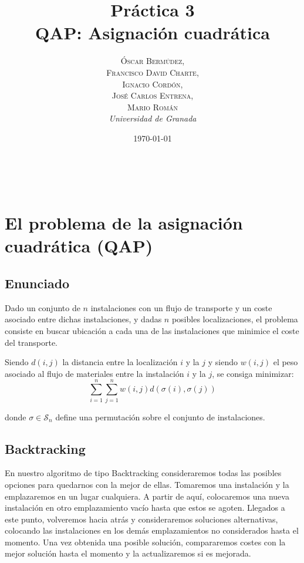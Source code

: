 \documentclass[a4paper, 11pt]{article} %
\title{\textbf{Práctica 3}\\ %
QAP: Asignación cuadrática} %
\author{\textsc{Óscar Bermúdez,\\Francisco David Charte,\\Ignacio Cordón,\\José Carlos Entrena,\\Mario Román} %
\\{\textit{Universidad de Granada}}} %
\date{\today} %
\makeatletter
\renewcommand{\maketitle}{ %
\begin{flushright} %
{\LARGE\@title} %

\vspace{50pt} %

{\large\@author} %
\\\@date %

\vspace{40pt} %
\end{flushright}
}
\makeatother
\begin{document}
\maketitle %

\renewcommand{\abstractname}{Resumen} %
\begin{abstract}
\end{abstract}
{\parskip=2pt
\tableofcontents
}
\pagebreak

\section{El problema de la asignación cuadrática (QAP)}
      \subsection{Enunciado}
	Dado un conjunto de $n$ instalaciones con un flujo de transporte y
	un coste asociado entre dichas instalaciones, y dadas $n$ posibles localizaciones,
	el problema consiste en buscar ubicación a cada una de las instalaciones que
	minimice el coste del transporte.
	
	Siendo $d(i,j)$ la distancia entre la localización $i$ y la $j$
	y siendo $w(i,j)$ el peso asociado al flujo de materiales entre la instalación
	$i$ y la $j$, se consiga minimizar:
	\begin{equation}
	\sum_{i=1}^n \sum_{j=1}^nw(i,j) d(\sigma(i),\sigma(j))
	\label{coste}
	\end{equation}

	donde $\sigma \in \mathcal{S}_n$ define una permutación sobre el conjunto de instalaciones.

    
      \subsection{Backtracking}
	En nuestro algoritmo de tipo Backtracking consideraremos todas las posibles opciones para quedarnos con la mejor de ellas.
	Tomaremos una instalación y la emplazaremos en un lugar cualquiera. A partir de aquí, colocaremos una nueva instalación
	en otro emplazamiento vacío hasta que estos se agoten. Llegados a este punto, volveremos hacia atrás y consideraremos soluciones alternativas, colocando las instalaciones en los demás emplazamientos no considerados hasta el momento. Una vez obtenida una posible solución, compararemos costes con la mejor solución hasta el momento y la actualizaremos si es mejorada.       
	
\end{document}
